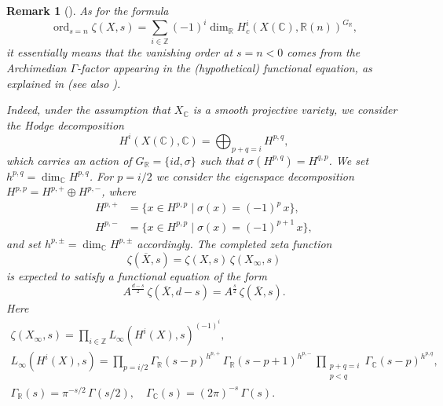 \documentclass[10pt,a4paper,oneside]{article}
\DeclareMathOperator{\ord}{ord}
\newcommand{\CC}{\mathbb{C}}
\newcommand{\RR}{\mathbb{R}}
\newcommand{\ZZ}{\mathbb{Z}}
\theoremstyle{myplain}
\theoremstyle{mydefinition}
\newtheorem{remark}[theorem]{Remark}
\numberwithin{equation}{section}
\begin{document}
\begin{remark}[{\cite[Proposition~5.13]{Flach-Morin-2018}}]
  \label{rmk:archimedian-euler-factor}
  As for the formula
  \[ \ord_{s=n} \zeta (X,s) =
    \sum_{i \in \ZZ} (-1)^i \dim_\RR H^i_c (X(\CC), \RR (n))^{G_\RR}, \]
  it essentially means that the vanishing order at $s = n < 0$ comes from the
  Archimedian $\Gamma$-factor appearing in the (hypothetical) functional
  equation, as explained in \cite[\S\S 3,4]{Serre-1970}
  (see also \cite[\S 4]{Flach-Morin-2020}).

  Indeed, under the assumption that $X_\CC$ is a smooth projective variety, we
  consider the Hodge decomposition
  \[ H^i (X (\CC), \CC) = \bigoplus_{p+q = i} H^{p,q}, \]
  which carries an action of $G_\RR = \{ id, \sigma \}$ such that
  $\sigma (H^{p,q}) = H^{q,p}$. We set $h^{p,q} = \dim_\CC H^{p,q}$.
  For $p = i/2$ we consider the eigenspace decomposition
  $H^{p,p} = H^{p,+} \oplus H^{p,-}$, where
  \begin{align*}
    H^{p,+} & = \{ x \in H^{p,p} \mid \sigma (x) = (-1)^p\,x \},\\
    H^{p,-} & = \{ x \in H^{p,p} \mid \sigma (x) = (-1)^{p+1}\,x \},
  \end{align*}
  and set $h^{p,\pm} = \dim_\CC H^{p,\pm}$ accordingly.
  The completed zeta function
  $$\zeta (\overline{X}, s) = \zeta (X, s)\,\zeta (X_\infty, s)$$
  is expected to satisfy a functional equation of the form
  \[ A^{\frac{d-s}{2}}\,\zeta (\overline{X},d-s) =
    A^{\frac{s}{2}}\,\zeta (\overline{X},s). \]
  Here
  \begin{gather*}
    \zeta (X_\infty, s) = \prod_{i\in \ZZ} L_\infty (H^i (X),s)^{(-1)^i}, \\
    L_\infty (H^i (X), s) =
    \prod_{p = i/2} \Gamma_\RR (s - p)^{h^{p,+}}\,\Gamma_\RR (s-p+1)^{h^{p,-}} \,
    \prod_{\substack{p + q = i \\ p < q}} \Gamma_\CC (s - p)^{h^{p,q}}, \\
    \Gamma_\RR (s) = \pi^{-s/2} \, \Gamma (s/2), \quad
    \Gamma_\CC (s) = (2\pi)^{-s} \, \Gamma (s).
  \end{gather*}


\end{remark}
\end{document}
